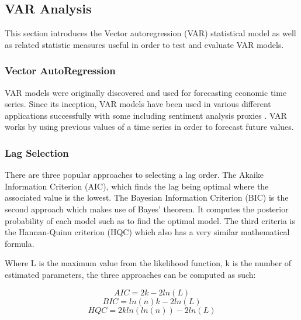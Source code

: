 \subsection{VAR Analysis}\label{chap:var lit rv}

This section introduces the Vector autoregression (VAR) statistical model as well as related statistic measures useful in order to test and evaluate VAR models.

\subsubsection{Vector AutoRegression}

VAR models were originally discovered and used for forecasting economic time series. Since its inception, VAR models have been used in various different applications successfully with some including sentiment analysis proxies \citep{georgoula2015using,zhao2015computational}. VAR works by using previous values of a time series in order to forecast future values.


\subsubsection{Lag Selection}\label{chap:lag selection lr}

There are three popular approaches to selecting a lag order. The Akaike Information Criterion (AIC), which finds the lag being optimal where the associated value is the lowest. The Bayesian Information Criterion (BIC) is the second approach which makes use of Bayes' theorem. It computes the posterior probability of each model such as to find the optimal model. The third criteria is the Hannan-Quinn criterion (HQC) which also has a very similar mathematical formula.

Where L is the maximum value from the likelihood function, k is the number of estimated parameters, the three approaches can be computed as such:

\begin{equation}
    AIC = 2k - 2ln(L)
\end{equation}
\begin{equation}
    BIC = ln(n)k - 2ln(L)
\end{equation}
\begin{equation}
    HQC = 2kln(ln(n)) - 2ln(L)
\end{equation}


